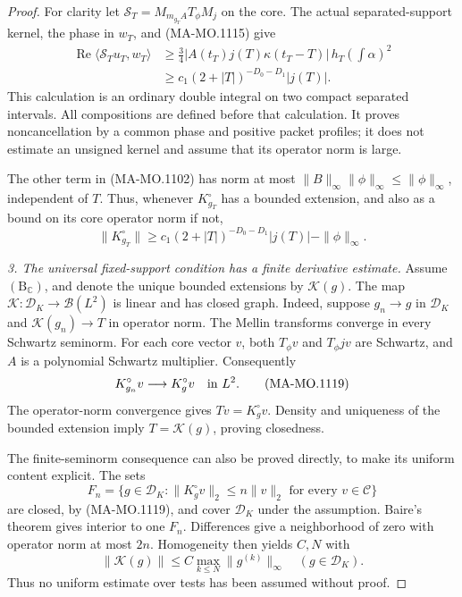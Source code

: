 \begin{proof}
For clarity let
\(\mathcal S_T=M_{m_{g_T}A}T_\phi M_j\)
on the core.  The actual separated-support
kernel, the phase in \(w_T\), and
(MA-MO.1115) give
\[
 \begin{split}
 \operatorname{Re}\langle\mathcal S_Tu_T,w_T\rangle
 &\ge\frac34|A(t_T)j(T)\kappa(t_T-T)|\,h_T
                                  \left(\int\alpha\right)^2\\
 &\ge c_1(2+|T|)^{-D_0-D_1}|j(T)|.
 \end{split}
\tag{MA-MO.1117}
\]
This calculation is an ordinary double
integral on two compact separated intervals.
All compositions are defined before that
calculation.  It proves noncancellation by
a common phase and positive packet profiles;
it does not estimate an unsigned kernel
and assume that its operator norm is large.

The other term in (MA-MO.1102) has norm
at most \(\|B\|_\infty\|\phi\|_\infty
\le\|\phi\|_\infty\), independent of \(T\).
Thus, whenever \(K^\circ_{g_T}\) has a
bounded extension, and also as a bound
on its core operator norm if not,
\[
 \|K^\circ_{g_T}\|
       \ge c_1(2+|T|)^{-D_0-D_1}|j(T)|
                              -\|\phi\|_\infty .
\tag{MA-MO.1118}
\]

\emph{3. The universal fixed-support condition
has a finite derivative estimate.}
Assume \(\mathrm{(B_{\mathbb C})}\), and denote
the unique bounded extensions by \(\mathcal K(g)\).
The map
\(\mathcal K:\mathscr D_K\to\mathcal B(L^2)\)
is linear and has closed graph.
Indeed, suppose \(g_n\to g\) in \(\mathscr D_K\)
and \(\mathcal K(g_n)\to T\) in operator norm.
The Mellin transforms converge in every
Schwartz seminorm.  For each core vector
\(v\), both \(T_\phi v\) and \(T_\phi jv\)
are Schwartz, and \(A\) is a polynomial
Schwartz multiplier.  Consequently
\[
           K^\circ_{g_n}v\longrightarrow K^\circ_gv
                                      \quad\hbox{in }L^2.
\tag{MA-MO.1119}
\]
The operator-norm convergence gives
\(Tv=K^\circ_gv\).  Density and uniqueness
of the bounded extension imply
\(T=\mathcal K(g)\), proving closedness.

The finite-seminorm consequence can also
be proved directly, to make its uniform
content explicit.  The sets
\[
 F_n=\{g\in\mathscr D_K:
        \|K^\circ_gv\|_2\le n\|v\|_2
                              \text{ for every }v\in\mathscr C\}
\tag{MA-MO.1120}
\]
are closed, by (MA-MO.1119), and cover
\(\mathscr D_K\) under the assumption.
Baire's theorem gives interior to one
\(F_n\).  Differences give a neighborhood
of zero with operator norm at most \(2n\).
Homogeneity then yields \(C,N\) with
\[
              \|\mathcal K(g)\|
                  \le C\max_{k\le N}\|g^{(k)}\|_\infty
                                      \quad(g\in\mathscr D_K).
\tag{MA-MO.1121}
\]
Thus no uniform estimate over tests has
been assumed without proof.


\end{proof}
